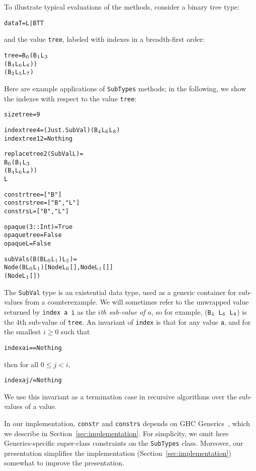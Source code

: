 \documentclass{sigplanconf}
\newenvironment{code}{\begin{alltt}\footnotesize}{\end{alltt}}
\newcommand{\ttp}[1]{\texttt{#1}}
\newcommand{\sub}[1]{\(\sb{#1}\)}
\begin{document}
\noindent
To illustrate typical evaluations of the methods, consider a binary tree type:
%
\begin{code}
data T = L | B T T
\end{code}
%
\noindent
and the value \ttp{tree}, labeled with indexes in a breadth-first order:
%
\begin{code}
tree = B\sub{0} (B\sub{1} L\sub{3}
             (B\sub{4} L\sub{6} L\sub{8}))
          (B\sub{2} L\sub{5} L\sub{7})
\end{code}
%
\noindent
Here are example applications of \ttp{SubTypes} methods; in the following, we
show the indexes with respect to the value \ttp{tree}:
%
\begin{code}
size tree = 9

index tree 4  = (Just . SubVal) (B\sub{4} L\sub{6} L\sub{8})
index tree 12 = Nothing

replace tree 2 (SubVal L) =
  B\sub{0} (B\sub{1} L\sub{3}
        (B\sub{4} L\sub{6} L\sub{8}))
     L

constr  tree = ["B"]
constrs tree = ["B", "L"]
constrs L    = ["B", "L"]

opaque (3 :: Int) = True
opaque tree       = False
opaque L          = False

subVals (B (B L\sub{0} L\sub{1}) L\sub{2}) =
  Node (B L\sub{0} L\sub{1}) [Node L\sub{0} [], Node L\sub{1} []]
       (Node L\sub{1} [])
\end{code}
%
\noindent
The \ttp{SubVal} type is an existential data type, used as a generic container
for sub-values from a counterexample.  We will sometimes refer to the unwrapped
value returned by \ttp{index a i} as the \emph{$i$th sub-value of $a$}, so for
example, (\ttp{B\sub{4} L\sub{6} L\sub{8}}) is the 4th sub-value of \ttp{tree}.
An invariant of \ttp{index} is that for any value \ttp{a}, and for the smallest
$i \geq 0$ such that
%
\begin{code}
index a i == Nothing
\end{code}
%
\noindent
then for all $0 \leq j < i$,
%
\begin{code}
index a j /= Nothing
\end{code}
\noindent
We use this invariant as a termination case in recursive algorithms over the
sub-values of a value.

In our implementation, \ttp{constr} and \ttp{constrs} depends on GHC
Generics~\cite{generics}, which we describe in Section~\ref{sec:implementation}.
For simplicity, we omit here Generics-specific super-class constraints on the
\ttp{SubTypes} class.  Moreover, our presentation simplifies the implementation
(Section~\ref{sec:implementation}) somewhat to improve the presentation.
\end{document}

